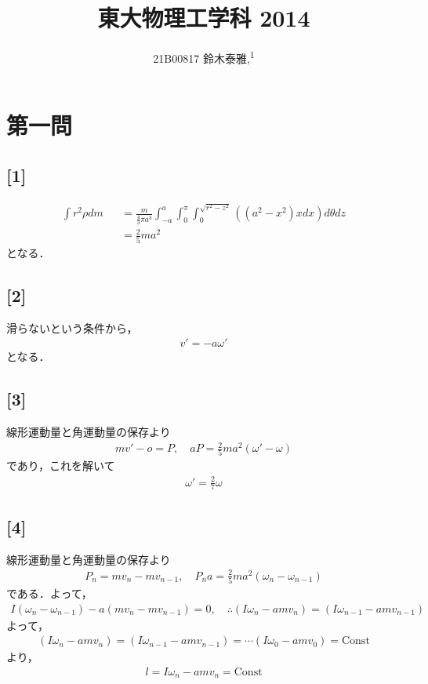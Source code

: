 \documentclass[12pt,dvipdfmx]{jsarticle}
\newcommand\authormark[1]{\textsuperscript{#1}}
\begin{document}
\title{東大物理工学科 2014}

\author{21B00817 鈴木泰雅,\authormark{1}}
\section*{\Large{第一問}}
\subsection*{\large{[1]}}
\begin{eqnarray}
  \int r^2 \rho dm &&= \frac{m}{\frac{4}{3}\pi a^3}\int_{-a}^{a} \int_0^\pi\int_0^{\sqrt{r^2-z^2}}((a^2-x^2)xdx) d\theta dz\\
  &&= \frac{2}{5}ma^2
\end{eqnarray}
となる．
\subsection*{\large{[2]}}
滑らないという条件から，
\begin{eqnarray}
  v' = -a\omega'
\end{eqnarray}
となる．
\subsection*{\large{[3]}}
線形運動量と角運動量の保存より
\begin{eqnarray}
  mv'-o =P,\quad aP = \frac{2}{5}ma^2(\omega'-\omega)
\end{eqnarray}
であり，これを解いて
\begin{eqnarray}
  \omega' = \frac{2}{7}\omega
\end{eqnarray}
\subsection*{\large{[4]}}
線形運動量と角運動量の保存より
\begin{eqnarray}
  P_n = mv_n - mv_{n-1}, \quad P_n a = \frac{2}{5}ma^2 (\omega_n-\omega_{n-1})
\end{eqnarray}
である．よって，
\begin{eqnarray}
  I(\omega_n-\omega_{n-1})- a(mv_n - mv_{n-1})=0, \quad\therefore (I\omega_n-amv_n) = (I\omega_{n-1}-amv_{n-1})
\end{eqnarray}
よって，
\begin{eqnarray}
  (I\omega_n-amv_n) = (I\omega_{n-1}-amv_{n-1}) = \cdots (I\omega_{0}-amv_{0}) = \text{Const}
\end{eqnarray}
より，
\begin{eqnarray}
  l = I\omega_n-amv_n  = \text{Const}
\end{eqnarray}
\end{document}
